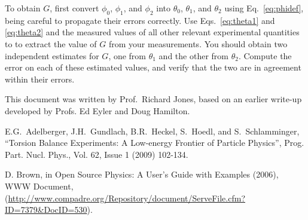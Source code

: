 \documentclass{revtex4}
\begin{document}
To obtain $G$, first convert $\phi_0$, $\phi_1$, and $\phi_2$ into $\theta_0$,
$\theta_1$, and $\theta_2$ using Eq.~\ref{eq:phidef}, being careful to
propagate their errors correctly.  Use Eqs.~\ref{eq:theta1} and \ref{eq:theta2}
and the measured values of all other relevant experimental quantities to
to extract the value of $G$ from your measurements.  You should obtain two
independent estimates for $G$, one from $\theta_1$ and the other from
$\theta_2$.  Compute the error on each of these estimated values, and verify
that the two are in agreement within their errors.

\begin{acknowledgments}
This document was written by Prof.\ Richard Jones, based on an earlier
write-up developed by Profs. Ed Eyler and Doug Hamilton.
\end{acknowledgments}

%

\begin{thebibliography}{9}

E.G.~Adelberger, J.H.~Gundlach, B.R.~Heckel, S.~Hoedl, and S.~Schlamminger,
``Torsion Balance Experiments: A Low-energy Frontier of Particle Physics'',
Prog. Part. Nucl. Phys., Vol. 62, Issue 1 (2009) 102-134.

D. Brown, in Open Source Physics: A User's Guide with Examples (2006),
WWW Document, 
(\url{http://www.compadre.org/Repository/document/ServeFile.cfm?ID=7379&DocID=530}).

\end{thebibliography}
\end{document}
